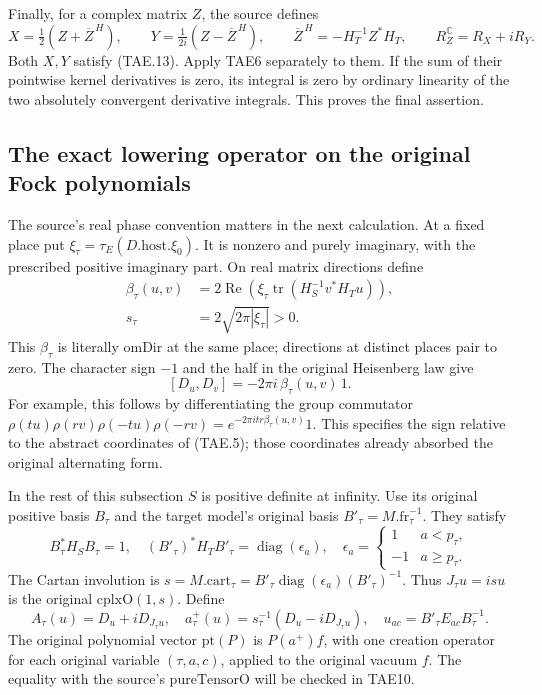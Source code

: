 Finally, for a complex matrix \(Z\), the source defines
\[
 X=\tfrac12(Z+\overline Z^{\,H}),\qquad
 Y=\tfrac1{2i}(Z-\overline Z^{\,H}),\qquad
 \overline Z^{\,H}=-H_T^{-1}Z^*H_T,\qquad
 R_Z^{\mathbb C}=R_X+iR_Y .
 \tag{TAE.40}
\]
Both \(X,Y\) satisfy (TAE.13).  Apply TAE6 separately
to them.  If the sum of their pointwise kernel
derivatives is zero, its integral is zero by ordinary
linearity of the two absolutely convergent derivative
integrals.  This proves the final assertion.

\subsection*{The exact lowering operator on the original Fock polynomials}

The source's real phase convention matters in the next calculation.
At a fixed place put \(\xi_\tau=\tau_E(D.\mathrm{host}.\xi_0)\).
It is nonzero and purely imaginary, with the prescribed positive
imaginary part.  On real matrix directions define
\[
 \begin{split}
 \beta_\tau(u,v)
   &=2\operatorname{Re}\!
       \left(\xi_\tau\operatorname{tr}
                 (H_S^{-1}v^*H_Tu)\right),\\
 s_\tau&=2\sqrt{2\pi|\xi_\tau|}>0.
 \end{split}
 \tag{TAE.41}
\]
This \(\beta_\tau\) is literally \(\mathrm{omDir}\) at the
same place; directions at distinct places pair to zero.
The character sign \(-1\) and the half in the original
Heisenberg law give
\[
 [D_u,D_v]=-2\pi i\,\beta_\tau(u,v)\,1 .
 \tag{TAE.42}
\]
For example, this follows by differentiating the group
commutator
\(\rho(tu)\rho(rv)\rho(-tu)\rho(-rv)
       =e^{-2\pi itr\beta_\tau(u,v)}1\).
This specifies the sign relative to the abstract coordinates
of (TAE.5); those coordinates already absorbed the original
alternating form.

In the rest of this subsection \(S\) is positive definite at
infinity.  Use its original positive basis \(B_\tau\) and the
target model's original basis \(B'_\tau=M.\mathrm{fr}_\tau^{-1}\).
They satisfy
\[
 B_\tau^*H_SB_\tau=1,\quad
 (B'_\tau)^*H_TB'_\tau
       =\operatorname{diag}(\epsilon_a),\quad
 \epsilon_a=\begin{cases}1&a<p_\tau,\\-1&a\ge p_\tau.\end{cases}
 \tag{TAE.43}
\]
The Cartan involution is
\(s=M.\mathrm{cart}_\tau
  =B'_\tau\operatorname{diag}(\epsilon_a)(B'_\tau)^{-1}\).
Thus \(J_\tau u=i s u\) is the original
\(\mathrm{cplxO}(1,s)\).  Define
\[
 A_\tau(u)=D_u+iD_{J_\tau u},\quad
 a_\tau^+(u)=s_\tau^{-1}(D_u-iD_{J_\tau u}),\quad
 u_{ac}=B'_\tau E_{ac}B_\tau^{-1}.
 \tag{TAE.44}
\]
The original polynomial vector \(\mathrm{pt}(P)\) is
\(P(a^+)f\), with one creation operator for each original
variable \((\tau,a,c)\), applied to the original vacuum \(f\).
The equality with the source's \(\mathrm{pureTensorO}\)
will be checked in TAE10.

